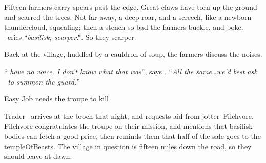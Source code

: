 \documentclass[10pt,twoside]{book}
\begin{document}

{
  \footnotesize
}

\clearpage


\pagestyle{minizine}%

\begin{exampletext}
  Fifteen farmers carry spears past the \gls{edge}.
  Great claws have torn up the ground and scarred the trees.
  Not far away, a deep roar, and a screech, like a newborn thundercloud, squealing;
  then a stench so bad the farmers buckle, and boke.
  \marketBoatman\ cries ``\textit{\gls{basilisk}, scarper!}''.
  So they scarper.

  Back at the \gls{village}, huddled by a cauldron of soup, the farmers discuss the noises.

  ``\textit{ have no voice.
  I don't know what that was}'', says \marketBoatman.
  ``\textit{All the same\ldots we'd best ask \marketFence\ to summon the \gls{guard}.}''
\end{exampletext}

{Easy Job}%
{ needs the troupe to kill }%

Trader \marketFence\ arrives at the \gls{broch} that night, and requests aid from \gls{jotter}~Filchvore.
Filchvore congratulates the troupe on their mission, and mentions that \gls{basilisk} bodies can fetch a good price, then reminds them that half of the sale goes to the \gls{templeOfBeasts}.
The \gls{village} in question is fifteen miles down the road, so they should leave at dawn.

\iftoggle{intro}{
  \paragraph{If \pgls{pc} asks for better \glspl{weapon},}
  they can roll \roll{Charisma}{Empathy} at \tn[10].
  Success means the \emph{player} should interpret how the character might ask for free equipment.

  \paragraph{If \pgls{pc} chats to other \glspl{guard} in the \gls{broch},}
  \gls{gDigger}~\composeHumanName\ laughs at the notion of \pgls{basilisk} roaring.

  \begin{speechtext}
    \Glspl{monster} don't roar.
    That's why people call them `the voiceless'.
  \end{speechtext}
}{}
\end{document}
